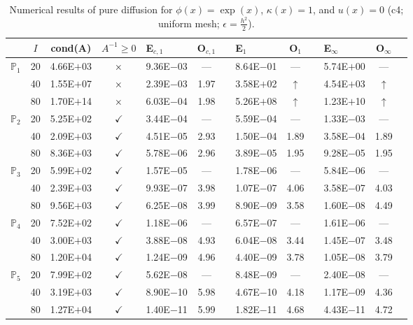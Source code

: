 \begin{table}[H]
\centering
\caption{Numerical results of pure diffusion for $\phi(x)=\exp(x)$, $\kappa(x)=1$, and $u(x)=0$ (c4; uniform mesh; $\epsilon=\frac{h^2}{2}$).}
\begin{tabular}{@{}l c c c l c c l c c l c c@{}}
\toprule
 & $I$ & cond(A) & $A^{-1}\geq 0$ &  E$_{c,1}$ & O$_{c,1}$ && E$_1$ & O$_1$ && E$_{\infty}$ & O$_{\infty}$\\
\midrule
\multirow{3}{*}{$\mathbb{P}_{1}$}
 & 20 & 4.66E$+$03 & $\times$ & 9.36E$-$03 & --- && 8.64E$-$01 & --- && 5.74E$+$00 & ---\\
 & 40 & 1.55E$+$07 & $\times$ & 2.39E$-$03 & 1.97 && 3.58E$+$02 & $\uparrow$ && 4.54E$+$03 & $\uparrow$\\
 & 80 & 1.70E$+$14 & $\times$ & 6.03E$-$04 & 1.98 && 5.26E$+$08 & $\uparrow$ && 1.23E$+$10 & $\uparrow$\\
\midrule
\multirow{3}{*}{$\mathbb{P}_{2}$}
 & 20 & 5.25E$+$02 & $\checkmark$ & 3.44E$-$04 & --- && 5.59E$-$04 & --- && 1.33E$-$03 & ---\\
 & 40 & 2.09E$+$03 & $\checkmark$ & 4.51E$-$05 & 2.93 && 1.50E$-$04 & 1.89 && 3.58E$-$04 & 1.89\\
 & 80 & 8.36E$+$03 & $\checkmark$ & 5.78E$-$06 & 2.96 && 3.89E$-$05 & 1.95 && 9.28E$-$05 & 1.95\\
\midrule
\multirow{3}{*}{$\mathbb{P}_{3}$}
 & 20 & 5.99E$+$02 & $\checkmark$ & 1.57E$-$05 & --- && 1.78E$-$06 & --- && 5.84E$-$06 & ---\\
 & 40 & 2.39E$+$03 & $\checkmark$ & 9.93E$-$07 & 3.98 && 1.07E$-$07 & 4.06 && 3.58E$-$07 & 4.03\\
 & 80 & 9.56E$+$03 & $\checkmark$ & 6.25E$-$08 & 3.99 && 8.90E$-$09 & 3.58 && 1.60E$-$08 & 4.49\\
\midrule
\multirow{3}{*}{$\mathbb{P}_{4}$}
 & 20 & 7.52E$+$02 & $\checkmark$ & 1.18E$-$06 & --- && 6.57E$-$07 & --- && 1.61E$-$06 & ---\\
 & 40 & 3.00E$+$03 & $\checkmark$ & 3.88E$-$08 & 4.93 && 6.04E$-$08 & 3.44 && 1.45E$-$07 & 3.48\\
 & 80 & 1.20E$+$04 & $\checkmark$ & 1.24E$-$09 & 4.96 && 4.40E$-$09 & 3.78 && 1.05E$-$08 & 3.79\\
\midrule
\multirow{3}{*}{$\mathbb{P}_{5}$}
 & 20 & 7.99E$+$02 & $\checkmark$ & 5.62E$-$08 & --- && 8.48E$-$09 & --- && 2.40E$-$08 & ---\\
 & 40 & 3.19E$+$03 & $\checkmark$ & 8.90E$-$10 & 5.98 && 4.67E$-$10 & 4.18 && 1.17E$-$09 & 4.36\\
 & 80 & 1.27E$+$04 & $\checkmark$ & 1.40E$-$11 & 5.99 && 1.82E$-$11 & 4.68 && 4.43E$-$11 & 4.72\\
\bottomrule
\end{tabular}
\end{table}